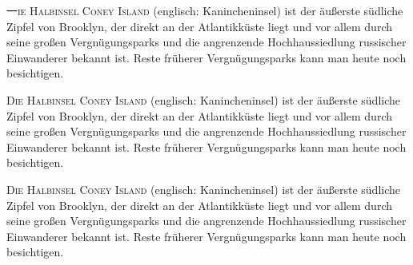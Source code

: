\documentclass{article}
\begin{document}
\lettrine{一}{ie Halbinsel Coney Island} (englisch: Kanin­chen­insel) ist der äußer­ste süd­liche Zipfel von Brook­lyn, der direkt an der At­lantik­küste liegt und vor allem durch seine großen Ver­gnü­gungs­parks und die an­gren­zende Hoch­haus­sied­lung rus­si­scher Ein­wan­derer be­kannt ist. Reste früherer Ver­gnü­gungs­parks kann man heute noch be­sich­tigen. 

\bigskip

\lettrine[lines=1]{D}{ie Halbinsel Coney Island} (englisch: Kanin­chen­insel) ist der äußer­ste süd­liche Zipfel von Brook­lyn, der direkt an der At­lantik­küste liegt und vor allem durch seine großen Ver­gnü­gungs­parks und die an­gren­zende Hoch­haus­sied­lung rus­si­scher Ein­wan­derer be­kannt ist. Reste früherer Ver­gnü­gungs­parks kann man heute noch be­sich­tigen. 

\bigskip

\lettrine[lines=3]{D}{ie Halbinsel Coney Island} (englisch: Kanin­chen­insel) ist der äußer­ste süd­liche Zipfel von Brook­lyn, der direkt an der At­lantik­küste liegt und vor allem durch seine großen Ver­gnü­gungs­parks und die an­gren­zende Hoch­haus­sied­lung rus­si­scher Ein­wan­derer be­kannt ist. Reste früherer Ver­gnü­gungs­parks kann man heute noch be­sich­tigen. 
\end{document}
